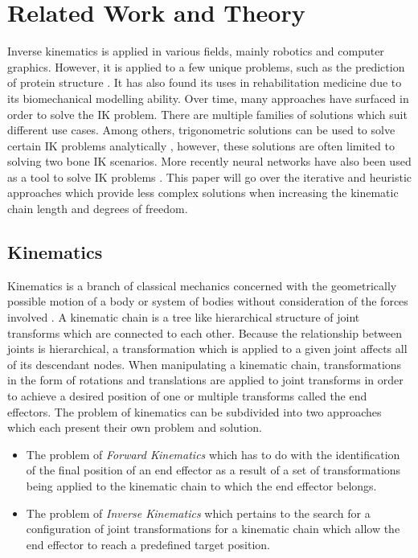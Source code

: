 \chapter{Related Work and Theory}
Inverse kinematics is applied in various fields, mainly robotics and computer
graphics. However, it is applied to a few unique problems, such as the
prediction of protein structure \cite{ccd_protein}. It has also found its uses in
rehabilitation medicine due to its biomechanical modelling ability. Over time,
many approaches have surfaced in order to solve the IK problem. There are
multiple families of solutions \cite{Aristidou2011} which suit different use
cases. Among others, trigonometric solutions can be used to solve certain IK
problems analytically \cite{raheem_trig}, however, these solutions are often limited to solving two
bone IK scenarios. More recently neural networks have also been used as a tool
to solve IK problems \cite{nn_IK}. This paper will go over the iterative and
heuristic approaches which provide less complex solutions when increasing the
kinematic chain length and degrees of freedom.

\section{Kinematics}
Kinematics is a branch of classical mechanics
concerned with the geometrically possible motion of a body or system of bodies
without consideration of the forces involved \cite{kinematics_britannica}.
A kinematic chain is a tree like hierarchical structure of joint transforms
which are connected to each other. Because the relationship between joints is
hierarchical, a transformation which is applied to a given joint affects all of
its descendant nodes. When manipulating a kinematic chain, transformations in
the form of rotations and translations are applied to joint transforms in order
to achieve a desired position of one or multiple transforms called the end
effectors. The problem of kinematics can be subdivided into two approaches which
each present their own problem and solution.

\begin{itemize}
    \item The problem of \textit{Forward Kinematics} which has to do with the
        identification of the final position of an end effector as a result of
        a set of transformations being applied to the kinematic chain to which
        the end effector belongs.
    \item The problem of \textit{Inverse Kinematics} which pertains to the
        search for a configuration of joint transformations for a kinematic
        chain which allow the end effector to reach a predefined target
        position.
\end{itemize}

